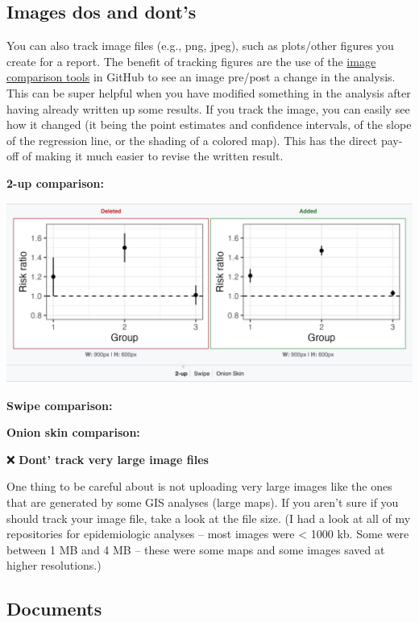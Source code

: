 \documentclass[
]{book}
\begin{document}
\subsection{Images dos and dont's}\label{images-dos-and-donts}

You can also track image files (e.g., png, jpeg), such as plots/other figures
you create for a report. The benefit of tracking figures are the use of the
\href{https://github.blog/2011-03-21-behold-image-view-modes/}{image comparison tools}
in GitHub to see an image pre/post a change in the
analysis. This can be super helpful when you have modified something in the
analysis after having already written up some results. If you track the image,
you can easily see how it changed (it being the point estimates and confidence
intervals, of the slope of the regression line, or the shading of a colored map).
This has the direct pay-off of making it much easier to revise the written
result.

\textbf{2-up comparison:}

\includegraphics[width=1\linewidth]{./figures/2-up-example}

\textbf{Swipe comparison:}

\textbf{Onion skin comparison:}

❌ \textbf{Dont' track very large image files}

One thing to be careful about is not uploading very large images like the
ones that are generated by some GIS analyses (large maps). If you aren't sure if
you should track your image file, take a look at the file size. (I had a look at
all of my repositories for epidemiologic analyses -- most images were \textless{} 1000 kb.
Some were between 1 MB and 4 MB -- these were some maps and some images saved at
higher resolutions.)

\subsection{Documents}\label{documents}
\end{document}
